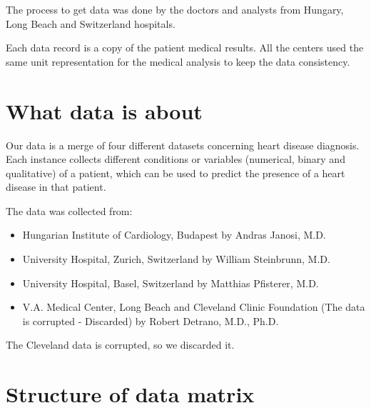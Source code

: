 \documentclass[a4paper,12pt]{article}
\begin{document}
    The process to get data was done by the doctors and analysts from Hungary, Long Beach and Switzerland hospitals.

    Each data record is a copy of the patient medical results. All the centers used the same unit representation for the medical analysis to keep the data consistency.

\section{What data is about}

    Our data is a merge of four different datasets concerning heart disease diagnosis.
    Each instance collects different conditions or variables (numerical, binary and qualitative) of a patient,
    which can be used to predict the presence of a heart disease in that patient.

    The data was collected from:

    \begin{itemize}

        \item Hungarian Institute of Cardiology, Budapest by Andras Janosi, M.D.
        \item University Hospital, Zurich, Switzerland by William Steinbrunn, M.D.
        \item University Hospital, Basel, Switzerland by Matthias Pfisterer, M.D.
        \item V.A. Medical Center, Long Beach and Cleveland Clinic Foundation (The data is corrupted - Discarded) by Robert Detrano, M.D., Ph.D.

    \end{itemize}

    The Cleveland data is corrupted, so we discarded it.

\section{Structure of data matrix}
\end{document}
